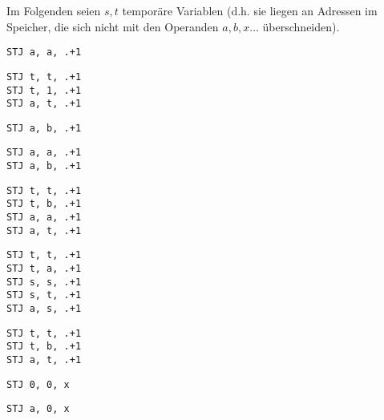 \documentclass[a4paper,11pt]{article}             %
\begin{document}
\setcounter{excnt}{11}
\begin{ex}
  \leavevmode
  \begin{exlist}
  \item Im Folgenden seien $s, t$ temporäre Variablen (d.h. sie liegen an
    Adressen im Speicher, die sich nicht mit den Operanden $a, b,x\dots$ überschneiden).
  \begin{multicols}{2}
  \begin{exlist}
  \item
    \begin{lstlisting}
STJ a, a, .+1 
    \end{lstlisting}

  \item
    \begin{lstlisting}
STJ t, t, .+1
STJ t, 1, .+1
STJ a, t, .+1
    \end{lstlisting}
    
  \item
    \begin{lstlisting}
STJ a, b, .+1
    \end{lstlisting}

  \item
    \begin{lstlisting}
STJ a, a, .+1
STJ a, b, .+1
    \end{lstlisting}

  \item
    \begin{lstlisting}
STJ t, t, .+1
STJ t, b, .+1
STJ a, a, .+1
STJ a, t, .+1
    \end{lstlisting}
    
  \item
    \begin{lstlisting}
STJ t, t, .+1
STJ t, a, .+1
STJ s, s, .+1
STJ s, t, .+1
STJ a, s, .+1
    \end{lstlisting}
    
  \item
    \begin{lstlisting}
STJ t, t, .+1
STJ t, b, .+1
STJ a, t, .+1
    \end{lstlisting}
    
  \item
    \begin{lstlisting}
STJ 0, 0, x
    \end{lstlisting}
    
  \item
    \begin{lstlisting}
STJ a, 0, x
    \end{lstlisting}
    

\end{exlist}
\end{multicols}
\end{exlist}
\end{ex}
\end{document}
